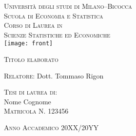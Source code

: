 

\pagestyle{empty} 

\begin{titlepage}
  
 \begin{center}
 {\large  

 \hfill

 \vfill
 {
 {\Large \textsc{Università degli studi di Milano--Bicocca}}\\
 {\textsc{Scuola di Economia e Statistica}}\\
 \vfill
	\textsc{Corso di Laurea  in} \\
	\textsc{Scienze Statistiche ed Economiche} \\
	\vfill
	\texttt{[image: front]}
 \vfill
 
 {\Huge\color{Maroon}\textsc{Titolo elaborato}}\\
 }
}
\end{center}

\vfill
{
\large
\begin{flushleft}
\textsc{Relatore}: Dott. Tommaso Rigon \\
\end{flushleft}

\vfill
\begin{flushright}
\textsc{Tesi di laurea di}:\\
 Nome Cognome\\
\textsc{Matricola N. 123456}
\end{flushright}

\vfill
\begin{center}
\textsc{Anno Accademico 20XX/20YY}
\end{center}

}
\end{titlepage}

